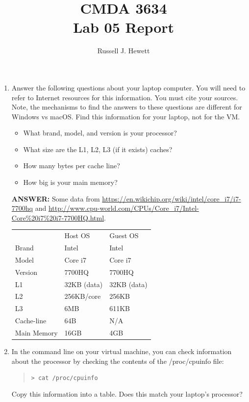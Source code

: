 \documentclass[letter]{article}
\title{CMDA 3634 \\ Lab 05 Report}
\author{Russell J. Hewett}
\date{}
\newcommand{\cmd}[1]{\begin{quote}\texttt{> #1}\end{quote}}
\begin{document}
\maketitle

    \begin{enumerate}
        \item Answer the following questions about your laptop computer.  You will need to refer to Internet resources for this information.  You must cite your sources.  Note, the mechanisms to find the answers to these questions are different for Windows vs macOS.  Find this information for your laptop, not for the VM.
            \begin{itemize}
                \item What brand, model, and version is your processor?
                \item What size are the L1, L2, L3 (if it exists) caches?
                \item How many bytes per cache line? 
                \item How big is your main memory?
            \end{itemize}
        
        \textbf{ANSWER:} %
        Some data from \url{https://en.wikichip.org/wiki/intel/core_i7/i7-7700hq} and \url{http://www.cpu-world.com/CPUs/Core_i7/Intel-Core%20i7%20i7-7700HQ.html}.\\[1ex]
        \begin{tabular}{lll}
                    & Host OS     & Guest OS \\
        Brand       & Intel       & Intel    \\
        Model       & Core i7     & Core i7  \\
        Version     & 7700HQ      & 7700HQ   \\
        L1          & 32KB (data) & 32KB (data) \\
        L2          & 256KB/core  & 256KB \\
        L3          & 6MB         & 611KB \\
        Cache-line  & 64B         & N/A \\
        Main Memory & 16GB        & 4GB
        \end{tabular}

        \item In the command line on your virtual machine, you can check information about the processor by checking the contents of the /proc/cpuinfo file: \cmd{cat /proc/cpuinfo}
        Copy this information into a table. Does this match your laptop's 
        processor? 
        

\end{enumerate}
\end{document}
